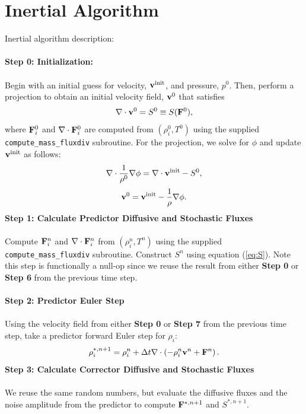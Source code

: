 \documentclass[final]{siamltex}
\def\Fb {{\bf F}}
\def\vb {{\bf v}}
\begin{document}
\section{Inertial Algorithm}
Inertial algorithm description:\\ \\
{\bf Step 0: Initialization:}\\ \\
Begin with an initial guess for velocity, $\vb^{\rm init}$, and pressure, $p^0$.
Then, perform a projection to obtain an initial velocity field, $\vb^0$ that satisfies
\begin{equation}
\nabla\cdot\vb^0 = S^0 \equiv S(\Fb^0),
\end{equation}
where $\Fb_i^0$ and $\nabla\cdot\Fb_i^0$ are computed from $(\rho_i^0,T^0)$ using the 
supplied {\tt compute\_mass\_fluxdiv} subroutine.
For the projection, we solve for $\phi$ and update $\vb^{\rm init}$ as follows:
\begin{equation}
\nabla\cdot\frac{1}{\rho^0}\nabla\phi = \nabla\cdot\vb^{\rm init} - S^0,
\end{equation}
\begin{equation}
\vb^0 = \vb^{\rm init} - \frac{1}{\rho}\nabla\phi.
\end{equation}
{\bf Step 1: Calculate Predictor Diffusive and Stochastic Fluxes}\\ \\
Compute $\Fb_i^n$ and $\nabla\cdot\Fb_i^n$ from $(\rho_i^n,T^n)$ using the supplied 
{\tt compute\_mass\_fluxdiv} subroutine.  Construct $S^n$ using equation (\ref{eq:S}).
Note this step is functionally a null-op since we reuse the result from 
either {\bf Step 0} or {\bf Step 6} from the previous time step.\\ \\
{\bf Step 2: Predictor Euler Step}\\ \\
Using the velocity field from either {\bf Step 0} or {\bf Step 7} from the previous
time step, take a predictor forward Euler step for $\rho_i$:
\begin{equation}
\rho_i^{*,n+1} = \rho_i^n + \Delta t\nabla\cdot\left(-\rho_i^n\vb^n + \Fb^n\right).
\end{equation}
{\bf Step 3: Calculate Corrector Diffusive and Stochastic Fluxes}\\ \\
We reuse the same random numbers, but evaluate the diffusive fluxes and the noise amplitude from the predictor
to compute $\Fb^{*,n+1}$ and $S^{*,n+1}$.\\ \\
\end{document}

